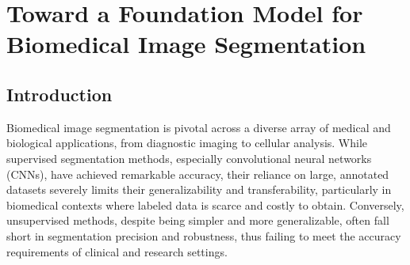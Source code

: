 \documentclass[./dissertation.tex]{subfiles}
\begin{document}
\chapter{Toward a Foundation Model for Biomedical Image Segmentation}

\section{Introduction}


Biomedical image segmentation is pivotal across a diverse array of medical and biological applications, from diagnostic imaging to cellular analysis. While supervised segmentation methods, especially convolutional neural networks (CNNs), have achieved remarkable accuracy, their reliance on large, annotated datasets severely limits their generalizability and transferability, particularly in biomedical contexts where labeled data is scarce and costly to obtain. Conversely, unsupervised methods, despite being simpler and more generalizable, often fall short in segmentation precision and robustness, thus failing to meet the accuracy requirements of clinical and research settings.


\end{document}

